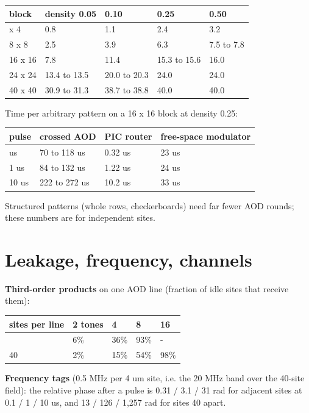 {\small
\begin{longtable}[]{@{}lllll@{}}
\toprule\noalign{}
block & density 0.05 & 0.10 & 0.25 & 0.50 \\
\midrule\noalign{}
\endhead
\bottomrule\noalign{}
\endlastfoot
4 x 4 & 0.8 & 1.1 & 2.4 & 3.2 \\
8 x 8 & 2.5 & 3.9 & 6.3 & 7.5 to 7.8 \\
16 x 16 & 7.8 & 11.4 & 15.3 to 15.6 & 16.0 \\
24 x 24 & 13.4 to 13.5 & 20.0 to 20.3 & 24.0 & 24.0 \\
40 x 40 & 30.9 to 31.3 & 38.7 to 38.8 & 40.0 & 40.0 \\
\end{longtable}
}

Time per arbitrary pattern on a 16 x 16 block at density 0.25:

{\small
\begin{longtable}[]{@{}llll@{}}
\toprule\noalign{}
pulse & crossed AOD & PIC router & free-space modulator \\
\midrule\noalign{}
\endhead
\bottomrule\noalign{}
\endlastfoot
0.1 us & 70 to 118 us & 0.32 us & 23 us \\
1 us & 84 to 132 us & 1.22 us & 24 us \\
10 us & 222 to 272 us & 10.2 us & 33 us \\
\end{longtable}
}

Structured patterns (whole rows, checkerboards) need far fewer AOD
rounds; these numbers are for independent sites.

\hypertarget{3-leakage-frequency-channels}{%
\section{Leakage, frequency,
channels}\label{addressing-3-leakage-frequency-channels}}

\textbf{Third-order products} on one AOD line (fraction of idle sites
that receive them):

{\small
\begin{longtable}[]{@{}lllll@{}}
\toprule\noalign{}
sites per line & 2 tones & 4 & 8 & 16 \\
\midrule\noalign{}
\endhead
\bottomrule\noalign{}
\endlastfoot
16 & 6\% & 36\% & 93\% & - \\
40 & 2\% & 15\% & 54\% & 98\% \\
\end{longtable}
}

\textbf{Frequency tags} (0.5 MHz per 4 um site, i.e. the 20 MHz band
over the 40-site field): the relative phase after a pulse is 0.31 / 3.1
/ 31 rad for adjacent sites at 0.1 / 1 / 10 us, and 13 / 126 / 1,257 rad
for sites 40 apart.

